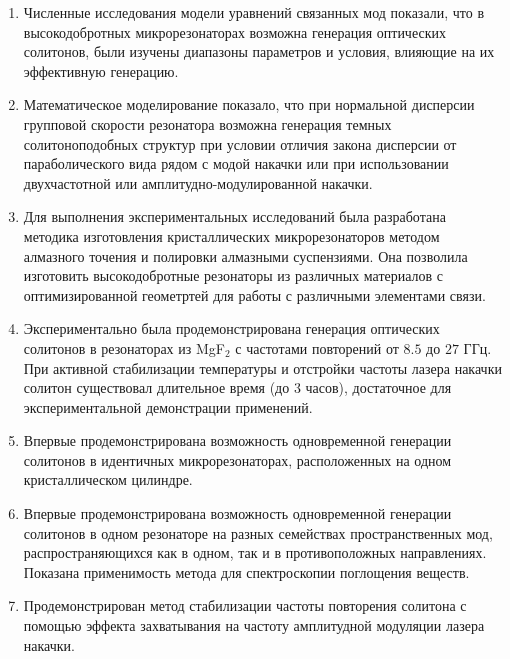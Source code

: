\begin{enumerate}
  \item Численные исследования модели уравнений связанных мод показали, что в высокодобротных микрорезонаторах возможна генерация оптических солитонов, были изучены диапазоны параметров и условия, влияющие на их эффективную генерацию.
  \item Математическое моделирование показало, что при нормальной дисперсии групповой скорости резонатора возможна генерация темных солитоноподобных структур при условии отличия закона дисперсии от параболического вида рядом с модой накачки или при использовании двухчастотной или амплитудно-модулированной накачки.
  \item Для выполнения экспериментальных исследований была разработана методика изготовления кристаллических микрорезонаторов методом алмазного точения и полировки алмазными суспензиями. Она позволила изготовить высокодобротные резонаторы из различных материалов с оптимизированной геометртей для работы с различными элементами связи.
  \item Экспериментально была продемонстрирована генерация оптических солитонов в резонаторах из MgF$_2$ с частотами повторений от $8.5$ до $27$ ГГц. При активной стабилизации температуры и отстройки частоты лазера накачки солитон существовал длительное время (до 3 часов), достаточное для экспериментальной демонстрации применений.
  \item Впервые продемонстрирована возможность одновременной генерации солитонов в идентичных микрорезонаторах, расположенных на одном кристаллическом цилиндре.
  \item Впервые продемонстрирована возможность одновременной генерации солитонов в одном резонаторе на разных семействах пространственных мод, распространяющихся как в одном, так и в противоположных направлениях. Показана применимость метода для спектроскопии поглощения веществ.
  \item Продемонстрирован метод стабилизации частоты повторения солитона с помощью эффекта захватывания на частоту амплитудной модуляции лазера накачки.
\end{enumerate}
